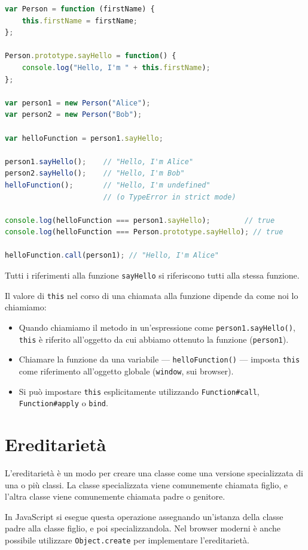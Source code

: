 \begin{lstlisting}[language=JavaScript]
var Person = function (firstName) {
    this.firstName = firstName;
};

Person.prototype.sayHello = function() {
    console.log("Hello, I'm " + this.firstName);
};

var person1 = new Person("Alice");
var person2 = new Person("Bob");

var helloFunction = person1.sayHello;

person1.sayHello();    // "Hello, I'm Alice"
person2.sayHello();    // "Hello, I'm Bob"
helloFunction();       // "Hello, I'm undefined"
                       // (o TypeError in strict mode)

console.log(helloFunction === person1.sayHello);        // true
console.log(helloFunction === Person.prototype.sayHello); // true

helloFunction.call(person1); // "Hello, I'm Alice"
\end{lstlisting}

Tutti i riferimenti alla funzione \texttt{sayHello} si riferiscono tutti alla stessa funzione.

Il valore di \texttt{this} nel corso di una chiamata alla funzione dipende da come noi lo chiamiamo:
\begin{itemize}
    \item Quando chiamiamo il metodo in un'espressione come \texttt{person1.sayHello()}, \texttt{this} è riferito all'oggetto da cui abbiamo ottenuto la funzione (\texttt{person1}).
    \item Chiamare la funzione da una variabile --- \texttt{helloFunction()} --- imposta \texttt{this} come riferimento all'oggetto globale (\texttt{window}, sui browser).
    \item Si può impostare \texttt{this} esplicitamente utilizzando \texttt{Function\#call}, \texttt{Function\#apply} o \texttt{bind}.
\end{itemize}

\section{Ereditarietà}

L'ereditarietà è un modo per creare una classe come una versione specializzata di una o più classi. La classe specializzata viene comunemente chiamata figlio, e l'altra classe viene comunemente chiamata padre o genitore.

In JavaScript si esegue questa operazione assegnando un'istanza della classe padre alla classe figlio, e poi specializzandola. Nel browser moderni è anche possibile utilizzare \texttt{Object.create} per implementare l'ereditarietà.

